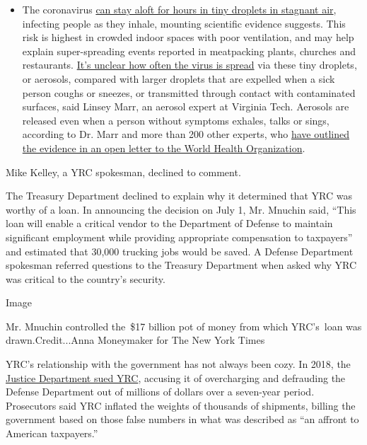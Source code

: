 \begin{itemize}
  \begin{itemize}
  \tightlist
  \item
    The coronavirus
    \href{https://www.nytimes3xbfgragh.onion/2020/07/04/health/239-experts-with-one-big-claim-the-coronavirus-is-airborne.html?action=click\&pgtype=Article\&state=default\&region=MAIN_CONTENT_3\&context=storylines_faq}{can
    stay aloft for hours in tiny droplets in stagnant air}, infecting
    people as they inhale, mounting scientific evidence suggests. This
    risk is highest in crowded indoor spaces with poor ventilation, and
    may help explain super-spreading events reported in meatpacking
    plants, churches and restaurants.
    \href{https://www.nytimes3xbfgragh.onion/2020/07/06/health/coronavirus-airborne-aerosols.html?action=click\&pgtype=Article\&state=default\&region=MAIN_CONTENT_3\&context=storylines_faq}{It's
    unclear how often the virus is spread} via these tiny droplets, or
    aerosols, compared with larger droplets that are expelled when a
    sick person coughs or sneezes, or transmitted through contact with
    contaminated surfaces, said Linsey Marr, an aerosol expert at
    Virginia Tech. Aerosols are released even when a person without
    symptoms exhales, talks or sings, according to Dr. Marr and more
    than 200 other experts, who
    \href{https://academic.oup.com/cid/article/doi/10.1093/cid/ciaa939/5867798}{have
    outlined the evidence in an open letter to the World Health
    Organization}.
  \end{itemize}
\end{itemize}

Mike Kelley, a YRC spokesman, declined to comment.

The Treasury Department declined to explain why it determined that YRC
was worthy of a loan. In announcing the decision on July 1, Mr. Mnuchin
said, ``This loan will enable a critical vendor to the Department of
Defense to maintain significant employment while providing appropriate
compensation to taxpayers'' and estimated that 30,000 trucking jobs
would be saved. A Defense Department spokesman referred questions to the
Treasury Department when asked why YRC was critical to the country's
security.

Image

Mr. Mnuchin controlled the~\$17 billion pot of money from which
YRC's~loan was drawn.Credit...Anna Moneymaker for The New York Times

YRC's relationship with the government has not always been cozy. In
2018, the
\href{https://www.justice.gov/opa/pr/united-states-sues-freight-companies-systematic-overcharging-shipments}{Justice
Department sued YRC}, accusing it of overcharging and defrauding the
Defense Department out of millions of dollars over a seven-year period.
Prosecutors said YRC inflated the weights of thousands of shipments,
billing the government based on those false numbers in what was
described as ``an affront to American taxpayers.''

